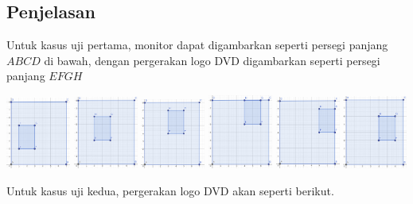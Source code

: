 \documentclass{article}
\begin{document}
\subsection*{Penjelasan}
Untuk kasus uji pertama, monitor dapat digambarkan seperti persegi panjang $ABCD$ di bawah, dengan pergerakan logo DVD digambarkan seperti persegi panjang $EFGH$

\includegraphics[width=80px]{sample-1-1}
\includegraphics[width=80px]{sample-1-2}
\includegraphics[width=80px]{sample-1-3}
\includegraphics[width=80px]{sample-1-4}
\includegraphics[width=80px]{sample-1-5}
\includegraphics[width=80px]{sample-1-6}

Untuk kasus uji kedua, pergerakan logo DVD akan seperti berikut.
\end{document}

